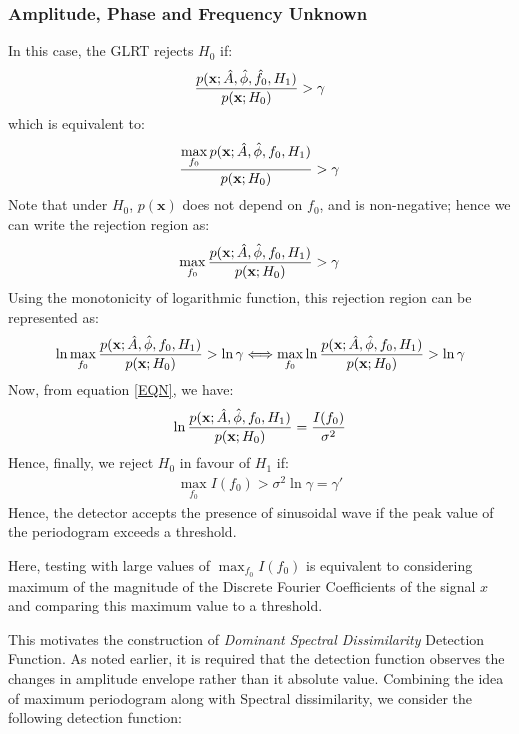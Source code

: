 \documentclass[10pt]{article}
\begin{document}
\subsubsection{Amplitude, Phase and Frequency Unknown}
In this case, the GLRT rejects $H_0$ if:
\begin{align*}
    \frac{p(\textbf{x};\Hat{A}, \Hat{\phi}, \Hat{f_0}, H_1) }{p(\textbf{x};H_0)} > \gamma
\end{align*}
which is equivalent to:
\begin{align*}
    \frac{\displaystyle\max_{f_0}p(\textbf{x};\Hat{A}, \Hat{\phi}, f_0, H_1) }{p(\textbf{x};H_0)} > \gamma
\end{align*}
Note that under $H_0$, $p(\textbf{x})$ does not depend on $f_0$, and is non-negative; hence we can write the rejection region as:
\begin{align*}
    \displaystyle\max_{f_0}\frac{p(\textbf{x};\Hat{A}, \Hat{\phi}, f_0, H_1) }{p(\textbf{x};H_0)} > \gamma
\end{align*}
Using the monotonicity of logarithmic function, this rejection region can be represented as:
\begin{align*}
   \ln \displaystyle\max_{f_0}\frac{p(\textbf{x};\Hat{A}, \Hat{\phi}, f_0, H_1) }{p(\textbf{x};H_0)} > \ln \gamma
   \Longleftrightarrow  \displaystyle\max_{f_0}\ln\frac{p(\textbf{x};\Hat{A}, \Hat{\phi}, f_0, H_1) }{p(\textbf{x};H_0)} > \ln \gamma \\
\end{align*}
Now, from equation \ref{EQN}, we have:
\begin{align*}
\ln \frac{p(\textbf{x};\Hat{A}, \Hat{\phi}, f_0, H_1) }{p(\textbf{x};H_0)}=\frac{I(f_0)}{\sigma^2}
\end{align*}
Hence, finally, we reject $H_0$ in favour of $H_1$ if:
\begin{align}
    \displaystyle\max_{f_0}I(f_0)>\sigma^2\ln\gamma=\gamma'
\end{align}
Hence, the detector accepts the presence of sinusoidal wave if the peak value of the periodogram exceeds a threshold.

Here, testing with large values of $\max_{f_0} I(f_0)$ is equivalent to considering maximum of the magnitude of the Discrete Fourier Coefficients of the signal $x$ and comparing this maximum value to a threshold.

This motivates the construction of \textit{Dominant Spectral Dissimilarity} Detection Function. As noted earlier, it is required that the detection function observes the changes in amplitude envelope rather than it absolute value. Combining the idea of maximum periodogram along with Spectral dissimilarity, we consider the following detection function:
\end{document}
